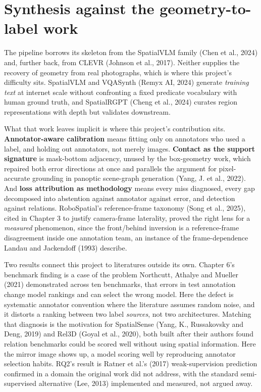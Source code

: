 \section{Synthesis against the geometry-to-label work}

The pipeline borrows its skeleton from the SpatialVLM family (Chen et al., 2024) and, further back, from CLEVR (Johnson et al., 2017). Neither supplies the recovery of geometry from real photographs, which is where this project's difficulty sits. SpatialVLM and VQASynth (Remyx AI, 2024) generate \textit{training text} at internet scale without confronting a fixed predicate vocabulary with human ground truth, and SpatialRGPT (Cheng et al., 2024) curates region representations with depth but validates downstream.

What that work leaves implicit is where this project's contribution sits. \textbf{Annotator-aware calibration} means fitting only on annotators who used a label, and holding out annotators, not merely images. \textbf{Contact as the support signature} is mask-bottom adjacency, unused by the box-geometry work, which repaired both error directions at once and parallels the argument for pixel-accurate grounding in panoptic scene-graph generation (Yang, J. et al., 2022). And \textbf{loss attribution as methodology} means every miss diagnosed, every gap decomposed into abstention against annotator against error, and detection against relations. RoboSpatial's reference-frame taxonomy (Song et al., 2025), cited in Chapter 3 to justify camera-frame laterality, proved the right lens for a \textit{measured} phenomenon, since the front/behind inversion is a reference-frame disagreement inside one annotation team, an instance of the frame-dependence Landau and Jackendoff (1993) describe.

Two results connect this project to literatures outside its own. Chapter 6's benchmark finding is a case of the problem Northcutt, Athalye and Mueller (2021) demonstrated across ten benchmarks, that errors in test annotation change model rankings and can select the wrong model. Here the defect is systematic annotator convention where the literature assumes random noise, and it distorts a ranking between two label \textit{sources}, not two architectures. Matching that diagnosis is the motivation for SpatialSense (Yang, K., Russakovsky and Deng, 2019) and Rel3D (Goyal et al., 2020), both built after their authors found relation benchmarks could be scored well without using spatial information. Here the mirror image shows up, a model scoring well by reproducing annotator selection habits. RQ2's result is Ratner et al.'s (2017) weak-supervision prediction confirmed in a domain the original work did not address, with the standard semi-supervised alternative (Lee, 2013) implemented and measured, not argued away.

